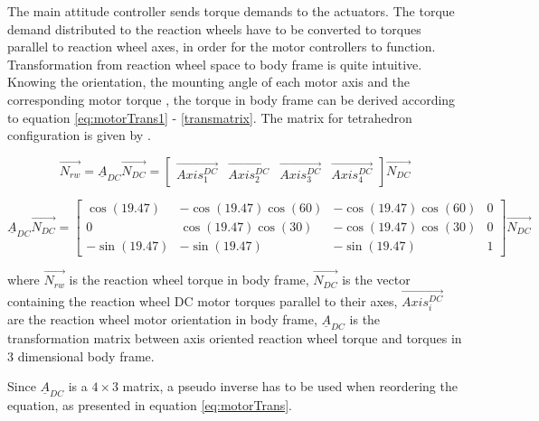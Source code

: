 The main attitude controller sends torque demands to the actuators. The torque demand distributed to the reaction wheels have to be converted to torques parallel to reaction wheel axes, in order for the motor controllers to function. Transformation from reaction wheel space to body frame is quite intuitive. Knowing the orientation, the mounting angle of each motor axis and the corresponding motor torque
, the torque in body frame can be derived according to equation \ref{eq:motorTrans1} - \ref{transmatrix}. The matrix for tetrahedron configuration is given by \cite{reactionWheelConfigThesis}.

\begin{equation}
\label{eq:motorTrans1}
\vec{N_{rw}} = \underline{A}_{DC} \vec{N_{DC}} = \begin{bmatrix}
\vec{Axis^{DC}_{1}}       & \vec{Axis^{DC}_{2}}   & \vec{Axis^{DC}_{3}}   & \vec{Axis^{DC}_{4}} 
\end{bmatrix} \vec{N_{DC}}
\end{equation}

\begin{equation}
\underline{A}_{DC} \vec{N_{DC}}  = 
\begin{bmatrix}
\cos(19.47)       & -\cos(19.47) \cos(60)  &  -\cos(19.47) \cos(60)  & 0 \\
0       & \cos(19.47) \cos(30)  &  -\cos(19.47) \cos(30)  & 0 \\
-\sin(19.47)       & -\sin(19.47)   &  -\sin(19.47)   & 1
\end{bmatrix} \vec{N_{DC}}
\label{transmatrix}
\end{equation}

where $\vec{N_{rw}}$ is the reaction wheel torque in body frame, $\vec{N_{DC}}$ is the vector containing the reaction wheel DC motor torques parallel to their axes, $\vec{Axis^{DC}_{i}}$ are the reaction wheel motor orientation in body frame, $\underline{A}_{DC}$ is the transformation matrix between axis oriented reaction wheel torque and torques in 3 dimensional body frame.



Since $\underline{A}_{DC} $ is a $ 4 \times 3 $ matrix, a pseudo inverse has to be used when reordering the equation, as presented in equation \ref{eq:motorTrans}. 

